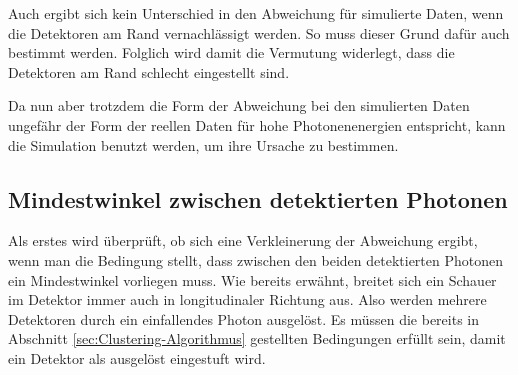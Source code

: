 \documentclass[a4paper,11pt,oneside,final,german,openbib,pdftex]{scrbook}
\begin{document}
{Auch ergibt sich kein Unterschied in den Abweichung für simulierte Daten, wenn die Detektoren am Rand vernachlässigt werden. So muss dieser Grund dafür auch bestimmt werden. Folglich wird damit die Vermutung widerlegt, dass die Detektoren am Rand schlecht eingestellt sind.



Da nun aber trotzdem die Form der Abweichung bei den simulierten Daten ungefähr der Form der reellen Daten für hohe Photonenenergien entspricht, kann die Simulation benutzt werden, um ihre Ursache zu bestimmen.


\subsection{Mindestwinkel zwischen detektierten Photonen}
\label{sec:Min-Openingangle}

Als erstes wird \"uberpr\"uft, ob sich eine Verkleinerung der Abweichung ergibt, wenn man die Bedingung stellt, dass zwischen den beiden detektierten Photonen ein Mindestwinkel vorliegen muss. 
Wie bereits erw\"ahnt, breitet sich ein Schauer im Detektor immer auch in longitudinaler Richtung aus. Also werden mehrere Detektoren durch ein einfallendes Photon ausgel\"ost. 
Es m\"ussen die bereits in Abschnitt \ref{sec:Clustering-Algorithmus} gestellten Bedingungen erf\"ullt sein, damit ein Detektor als ausgel\"ost eingestuft wird.

}
\end{document}
